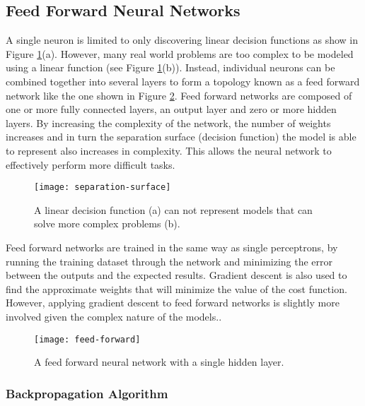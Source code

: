 \subsection{Feed Forward Neural Networks} \label{sec:background-artificial-neural-networks-feed-forward-neural-networks}

A single neuron is limited to only discovering linear decision functions as show in Figure \ref{fig:separation-surface}(a). However, many real world problems are too complex to be modeled using a linear function (see Figure \ref{fig:separation-surface}(b)). Instead, individual neurons can be combined together into several layers to form a topology known as a feed forward network like the one shown in Figure \ref{fig:feed-forward}. Feed forward networks are composed of one or more fully connected layers, an output layer and zero or more hidden layers\cite{Mitchell}. By increasing the complexity of the network, the number of weights increases and in turn the separation surface (decision function) the model is able to represent also increases in complexity. This allows the neural network to effectively perform more difficult tasks\cite{Bengio07scalinglearning}.

\begin{figure}[t]
	\centering
	\texttt{[image: separation-surface]}
	\caption{A linear decision function (a) can not represent models that can solve more complex problems (b).}
	\label{fig:separation-surface}
\end{figure}

Feed forward networks are trained in the same way as single perceptrons, by running the training dataset through the network and minimizing the error between the outputs and the expected results. Gradient descent is also used to find the approximate weights that will minimize the value of the cost function. However, applying gradient descent to feed forward networks is slightly more involved given the complex nature of the models.\cite{Le15atutorial}.

\begin{figure}[t]
	\centering
	\texttt{[image: feed-forward]}
	\caption{A feed forward neural network with a single hidden layer.}
	\label{fig:feed-forward}
\end{figure}

\subsubsection{Backpropagation Algorithm}

